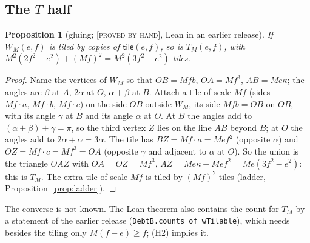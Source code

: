\documentclass[11pt,reqno]{amsart}
\theoremstyle{plain}
\newtheorem{proposition}[theorem]{Proposition}
\theoremstyle{definition}
\newcommand{\lab}[1]{\textup{[\textsc{#1}]}}
\newcommand{\PH}{\lab{proved by hand}}
\newcommand{\tile}{\mathsf{tile}}
\begin{document}
\subsection{The $T$ half}\label{sub:T}
\begin{proposition}[gluing; \PH{}, Lean in an earlier release]\label{prop:glue}
If $W_M(e,f)$ is tiled by copies of $\tile(e,f)$, so is $T_M(e,f)$, with $M^2(2f^2-e^2)+(Mf)^2=M^2(3f^2-e^2)$ tiles.
\end{proposition}
\begin{proof}
Name the vertices of $W_M$ so that $OB=Mfb$, $OA=Mf^3$, $AB=Me\kappa$; the angles are $\beta$ at $A$, $2\alpha$ at $O$, $\alpha{+}\beta$ at $B$. Attach a tile of scale $Mf$ (sides $Mf\cdot a,\,Mf\cdot b,\,Mf\cdot c$) on the side $OB$ outside $W_M$, its side $Mfb=OB$ on $OB$, with its angle $\gamma$ at $B$ and its angle $\alpha$ at $O$. At $B$ the angles add to $(\alpha+\beta)+\gamma=\pi$, so the third vertex $Z$ lies on the line $AB$ beyond $B$; at $O$ the angles add to $2\alpha+\alpha=3\alpha$. The tile has $BZ=Mf\cdot a=Mef^2$ (opposite $\alpha$) and $OZ=Mf\cdot c=Mf^3=OA$ (opposite $\gamma$ and adjacent to $\alpha$ at $O$). So the union is the triangle $OAZ$ with $OA=OZ=Mf^3$, $AZ=Me\kappa+Mef^2=Me(3f^2-e^2)$: this is $T_M$. The extra tile of scale $Mf$ is tiled by $(Mf)^2$ tiles (ladder, Proposition~\ref{prop:ladder}).
\end{proof}
The converse is not known. The Lean theorem also contains the count for $T_M$ by a statement of the earlier release (\texttt{DebtB.counts\_of\_wTilable}), which needs besides the tiling only $M(f-e)\ge f$; (H2) implies it.
\end{document}
